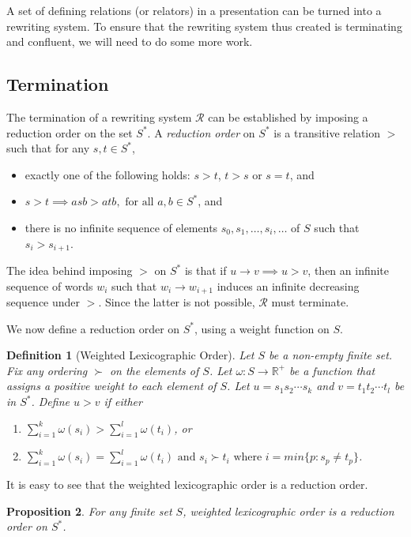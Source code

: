 \documentclass[utf8]{Frontiers_LaTex_Templates/frontiersFPHY} %
\newcommand{\rws}{\mathcal{R}}
\newcommand{\writesto}{\rightarrow}
\numberwithin{equation}{section}
\newtheorem{prop}{Proposition}[section]
\newtheorem{definition}[prop]{Definition}
\begin{document}
A set of defining relations (or relators) in a presentation can be turned into a rewriting system. To ensure that the rewriting system thus created is terminating and confluent, we will need to do some more work.

\subsection{Termination}

The termination of a rewriting system $\rws$ can be established by imposing a reduction order on the set $S^*$. A \emph{reduction order} on $S^*$ is a transitive relation $ > $ such that for any $s, t \in S^*$, 
\begin{itemize}
\item exactly one of the following holds: $s > t$, $t > s$ or $s=t$, and
\item $s > t \implies asb > atb, \text{ for all } a, b \in S^*$, and
\item there is no infinite sequence of elements $s_0, s_1, \dots, s_i, \dots$ of $S$ such that
$s_i > s_{i+1}$. 
\end{itemize}

The idea behind imposing $>$ on $S^*$ is that if $u \writesto v \implies u > v$, then an infinite sequence of words $w_i$ such that $w_i \writesto w_{i+1}$ induces an infinite decreasing sequence under $>$. Since the latter is not possible, $\rws$ must terminate.

We now define a reduction order on $S^*$, using a weight function on $S$.

\begin{definition}[Weighted Lexicographic Order]
Let $S$ be a non-empty finite set. Fix any ordering $\succ$ on the elements of $S$. Let $\omega : S \rightarrow \mathbb{R}^+$ be a function that assigns a positive weight to each element of $S$. Let $u=s_1s_2\cdots s_k$ and $v=t_1t_2\cdots t_l$ be in $S^*$. Define $u > v$ if either
\begin{enumerate}
	\item $\sum_{i=1}^k{\omega(s_i)} > \sum_{i=1}^{l}{\omega(t_i)}$, or
	\item $\sum_{i=1}^k{\omega(s_i)} =\sum_{i=1}^{l}{\omega(t_i)} \mbox{ and } s_i \succ t_i \mbox{ where } i=min\{p : s_p \neq t_p\}$.
\end{enumerate}
\end{definition}

It is easy to see that the weighted lexicographic order is a reduction order. 
\begin{prop}
For any finite set $S$, weighted lexicographic order is a reduction order on $S^*$.
\end{prop}
\end{document}

